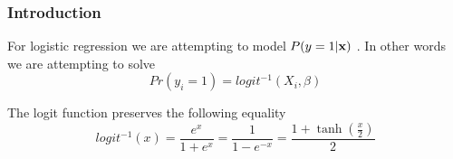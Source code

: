\documentclass{article}
\begin{document}
\subsubsection*{Introduction}
For logistic regression we are attempting to model $P(y=1 | \bf{x})$ . In other words we are attempting to solve
\begin{equation}
 Pr(y_i = 1) = logit^{-1}(X_i, \beta)
\end{equation}

The logit function preserves the following equality
\begin{equation}
logit^{-1}(x) = \frac{e^{x}}{1+ e^{x}}= \frac{1}{1- e^{-x}}=\frac{1+ \tanh(\frac{x}{2})}{2}
\end{equation}
\end{document}
